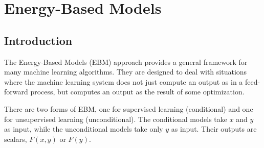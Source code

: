 \chapter{Energy-Based Models}

\section{Introduction}

The Energy-Based Models (EBM) approach provides a general framework for many machine learning algorithms. 
They are designed to deal with situations where the machine learning system does not just compute an output as in a feed-forward process, but computes an output as the result of some optimization.

There are two forms of EBM, one for supervised learning (conditional) and one for unsupervised learning (unconditional). 
The conditional models take $x$ and $y$ as input, while the unconditional models take only $y$ as input. 
Their outputs are scalars, $F(x,y)$ or $F(y)$.



